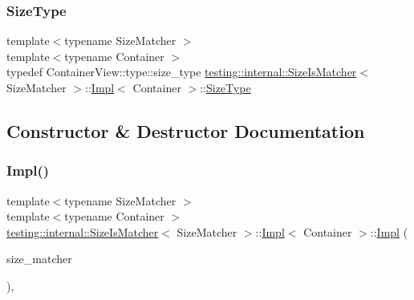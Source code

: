 \mbox{\label{classtesting_1_1internal_1_1_size_is_matcher_1_1_impl_a5548da0c4c2245ca2fb520f44f0a687a}} 
\subsubsection{\texorpdfstring{Size\+Type}{SizeType}}
{\footnotesize\ttfamily template$<$typename Size\+Matcher $>$ \\
template$<$typename Container $>$ \\
typedef Container\+View\+::type\+::size\+\_\+type \hyperlink{classtesting_1_1internal_1_1_size_is_matcher}{testing\+::internal\+::\+Size\+Is\+Matcher}$<$ Size\+Matcher $>$\+::\hyperlink{classtesting_1_1internal_1_1_size_is_matcher_1_1_impl}{Impl}$<$ Container $>$\+::\hyperlink{classtesting_1_1internal_1_1_size_is_matcher_1_1_impl_a5548da0c4c2245ca2fb520f44f0a687a}{Size\+Type}}



\subsection{Constructor \& Destructor Documentation}
\mbox{\label{classtesting_1_1internal_1_1_size_is_matcher_1_1_impl_aa5279c8598ec8982546350fb442223f3}} 
\subsubsection{\texorpdfstring{Impl()}{Impl()}}
{\footnotesize\ttfamily template$<$typename Size\+Matcher $>$ \\
template$<$typename Container $>$ \\
\hyperlink{classtesting_1_1internal_1_1_size_is_matcher}{testing\+::internal\+::\+Size\+Is\+Matcher}$<$ Size\+Matcher $>$\+::\hyperlink{classtesting_1_1internal_1_1_size_is_matcher_1_1_impl}{Impl}$<$ Container $>$\+::\hyperlink{classtesting_1_1internal_1_1_size_is_matcher_1_1_impl}{Impl} (\begin{DoxyParamCaption}\item[{const Size\+Matcher \&}]{size\+\_\+matcher }\end{DoxyParamCaption})\hspace{0.3cm}{\ttfamily [inline]}, {\ttfamily [explicit]}}



